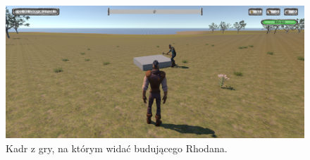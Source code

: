 \begin{figure}[h!]
    \centering
    \includegraphics[width=1\textwidth]{images/rozgrywka/rhodan9.png}
    \caption{Kadr z gry, na którym widać budującego Rhodana.}
\end{figure}